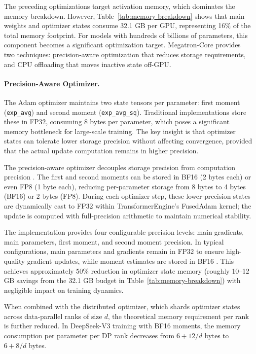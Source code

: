 \documentclass[10pt,logo,copyright]{nvidiatechreport}
\begin{document}
The preceding optimizations target activation memory, which dominates the memory breakdown. However, Table~\ref{tab:memory-breakdown} shows that main weights and optimizer states consume 32.1 GB per GPU, representing 16\% of the total memory footprint. For models with hundreds of billions of parameters, this component becomes a significant optimization target. Megatron-Core provides two techniques: precision-aware optimization that reduces storage requirements, and CPU offloading that moves inactive state off-GPU.

\paragraph{Precision-Aware Optimizer.}
The Adam optimizer \cite{kingma2014adam} maintains two state tensors per parameter: first moment (\texttt{exp\_avg}) and second moment (\texttt{exp\_avg\_sq}). Traditional implementations store these in FP32, consuming 8 bytes per parameter, which poses a significant memory bottleneck for large-scale training. The key insight is that optimizer states can tolerate lower storage precision without affecting convergence, provided that the actual update computation remains in higher precision.

The precision-aware optimizer decouples storage precision from computation precision \cite{dettmers2022optimizers8bit}. The first and second moments can be stored in BF16 (2 bytes each) or even FP8 (1 byte each), reducing per-parameter storage from 8 bytes to 4 bytes (BF16) or 2 bytes (FP8). During each optimizer step, these lower-precision states are dynamically cast to FP32 within TransformerEngine's FusedAdam kernel; the update is computed with full-precision arithmetic to maintain numerical stability.

The implementation provides four configurable precision levels: main gradients, main parameters, first moment, and second moment precision. In typical configurations, main parameters and gradients remain in FP32 to ensure high-quality gradient updates, while moment estimates are stored in BF16 \cite{liu2024deepseek}. This achieves approximately 50\% reduction in optimizer state memory (roughly 10--12 GB savings from the 32.1 GB budget in Table~\ref{tab:memory-breakdown}) with negligible impact on training dynamics.

When combined with the distributed optimizer, which shards optimizer states across data-parallel ranks of size $d$, the theoretical memory requirement per rank is further reduced. In DeepSeek-V3 training with BF16 moments, the memory consumption per parameter per DP rank decreases from $6+12/d$ bytes to $6+8/d$ bytes.
\end{document}
